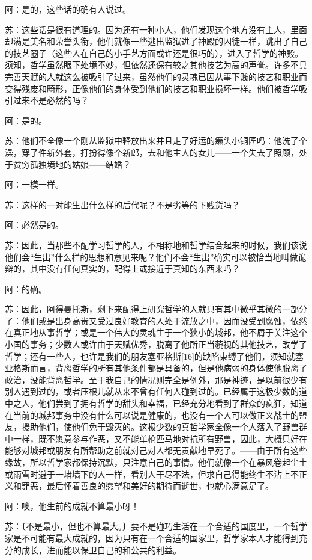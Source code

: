 \documentclass[12pt,oneside]{book}
\begin{document}
阿：是的，这些话的确有人说过。

苏：这些话是很有道理的。因为还有一种小人，他们发现这个地方没有主人，里面却满是美名和荣誉头衔，他们就像一些逃出监狱进了神殿的囚徒一样，跳出了自己的技艺圈子（这些人在自己的小手艺方面或许还是很巧的），进入了哲学的神殿。须知，哲学虽然眼下处境不妙，但依然还保有较之其他技艺为高的声誉。许多不具完善天赋的人就这么被吸引了过来，虽然他们的灵魂已因从事下贱的技艺和职业而变得残废和畸形，正像他们的身体受到他们的技艺和职业损坏一样。他们被哲学吸引过来不是必然的吗？

阿：是的。

苏：他们不全像一个刚从监狱中释放出来并且走了好运的癞头小铜匠吗：他洗了个澡，穿了件新外套，打扮得像个新郎，去和他主人的女儿——一个失去了照顾，处于贫穷孤独境地的姑娘——结婚？

阿：一模一样。

苏：这样的一对能生出什么样的后代呢？不是劣等的下贱货吗？

阿：必然是的。

苏：因此，当那些不配学习哲学的人，不相称地和哲学结合起来的时候，我们该说他们会“生出”什么样的思想和意见来呢？他们不会“生出”确实可以被恰当地叫做诡辩的，其中没有任何真实的，配得上或接近于真知的东西来吗？

阿：的确。

苏：因此，阿得曼托斯，剩下来配得上研究哲学的人就只有其中微乎其微的一部分了：他们或是出身高贵又受过良好教育的人处于流放之中，因而没受到腐蚀，依然在真正地从事哲学；或是一个伟大的灵魂生于一个狭小的城邦，他不屑于关注这个小国的事务；少数人或许由于天赋优秀，脱离了他所正当藐视的其他技艺，改学了哲学；还有一些人，也许是我们的朋友塞亚格斯[16]的缺陷束缚了他们，须知就塞亚格斯而言，背离哲学的所有其他条件都是具备的，但是他病弱的身体使他脱离了政治，没能背离哲学。至于我自己的情况则完全是例外，那是神迹，是以前很少有别人遇到过的，或者压根儿就从来不曾有任何人碰到过的。已经属于这极少数的道中之人，他们尝到了拥有哲学的甜头和幸福，已经充分地看到了群众的疯狂，知道在当前的城邦事务中没有什么可以说是健康的，也没有一个人可以做正义战士的盟友，援助他们，使他们免于毁灭的。这极少数的真哲学家全像一个人落入了野兽群中一样，既不愿意参与作恶，又不能单枪匹马地对抗所有野兽，因此，大概只好在能够对城邦或朋友有所帮助之前就对己对人都无贡献地早死了。——由于所有这些缘故，所以哲学家都保持沉默，只注意自己的事情。他们就像一个在暴风卷起尘土或雨雪时避于一堵墙下的人一样，看别人干尽不法，但求自己得能终生不沾上不正义和罪恶，最后怀着善良的愿望和美好的期待而逝世，也就心满意足了。

阿：噢，他生前的成就不算最小呀！

苏：〔不是最小，但也不算最大。〕要不是碰巧生活在一个合适的国度里，一个哲学家是不可能有最大成就的，因为只有在一个合适的国家里，哲学家本人才能得到充分的成长，进而能以保卫自己的和公共的利益。
\end{document}
